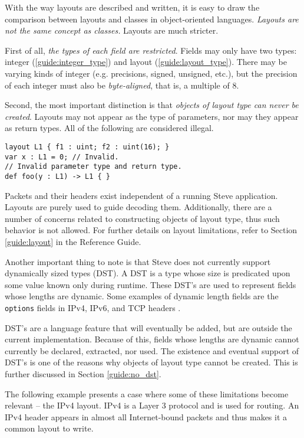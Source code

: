 With the way
layouts are described and written, it is easy to draw the comparison between layouts and
classes in object-oriented languages. \textit{Layouts are not the same concept as classes.} Layouts are much stricter.

First of all, \textit{the types of each field are restricted}. Fields may only
have two types: integer (\ref{guide:integer_type}) and layout
(\ref{guide:layout_type}). There may be varying kinds of integer (e.g.
precisions, signed, unsigned, etc.), but the precision of each integer must also
be \textit{byte-aligned}, that is, a multiple of 8.

Second, the most important distinction is that \textit{objects of layout type
can never be created}. Layouts may not appear as the type of parameters, nor may
they appear as return types. All of the following are considered illegal.

\begin{codepage}
\begin{lstlisting}
layout L1 { f1 : uint; f2 : uint(16); }
var x : L1 = 0; // Invalid.
// Invalid parameter type and return type.
def foo(y : L1) -> L1 { }
\end{lstlisting}
\end{codepage}

Packets and their headers exist independent of a running Steve application.
Layouts are purely used to guide decoding them. Additionally, there are a number
of concerns related to constructing objects of layout type, thus such behavior
is not allowed. For further details on layout limitations, refer to Section
\ref{guide:layout} in the Reference Guide.

Another important thing to note is that Steve does not currently support dynamically
sized types (DST). A DST is a type whose size is predicated upon some value
known only during runtime. These DST's are used to represent fields whose
lengths are dynamic. Some examples of dynamic length fields are the
\texttt{options} fields in IPv4, IPv6, and TCP headers \cite{ipv4_std, ipv6_std,
tcp_std}.

DST's are a language feature that will eventually be added, but are outside the
current implementation. Because of this, fields whose lengths are dynamic cannot
currently be declared, extracted, nor used. The existence and eventual support
of DST's is one of the reasons why objects of layout type cannot be created.
This is further discussed in Section \ref{guide:no_dst}.

The following example presents a case where some of these limitations become relevant -- the IPv4 layout. IPv4 is a Layer 3 protocol and is used
for routing. An IPv4 header appears in almost all Internet-bound packets and
thus makes it a common layout to write.

